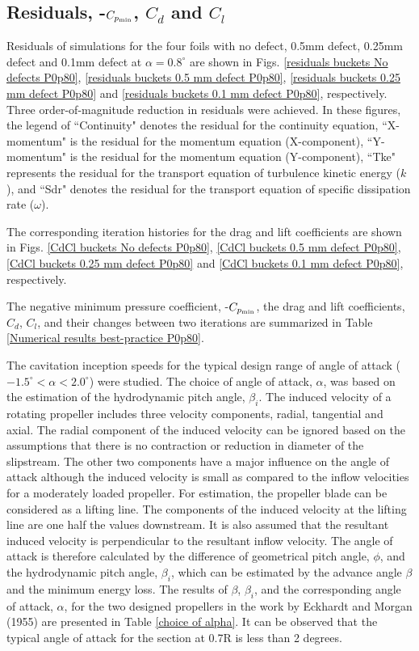 \documentclass[onecolumn,11pt]{report}
\begin{document}
\subsection{Residuals, -$C_{p_{\rm min}}$, $C_d$ and $C_l$}

Residuals of simulations for the four foils with no defect, 0.5mm defect, 0.25mm defect and 0.1mm defect at $\alpha=0.8^\circ$ are shown in Figs.  \ref{residuals buckets No defects P0p80}, \ref{residuals buckets 0.5 mm defect P0p80}, \ref{residuals buckets 0.25 mm defect P0p80} and \ref{residuals buckets 0.1 mm defect P0p80}, respectively. Three order-of-magnitude reduction in residuals were achieved. In these figures, the legend of ``Continuity" denotes the residual for the continuity equation, ``X-momentum" is the residual for the momentum equation (X-component), ``Y-momentum" is the residual for the momentum equation (Y-component), ``Tke" represents the residual for the transport equation of turbulence kinetic energy ($k$), and ``Sdr" denotes the residual for the transport equation of specific dissipation rate ($\omega$).

The corresponding iteration histories for the drag and lift coefficients are shown in Figs.  \ref{CdCl buckets No defects P0p80}, \ref{CdCl buckets 0.5 mm defect P0p80}, \ref{CdCl buckets 0.25 mm defect P0p80} and \ref{CdCl buckets 0.1 mm defect P0p80}, respectively.

The negative minimum pressure coefficient, -$C_{p_{\rm min}}$, the drag and lift coefficients, $C_d$, $C_l$, and their changes between  two iterations are summarized in Table  \ref{Numerical results best-practice P0p80}. 


The cavitation inception speeds for the typical design range of angle of attack ($-1.5^\circ < \alpha < 2.0^\circ$) were studied. The choice of angle of attack, $\alpha$, was based on the estimation of the hydrodynamic pitch angle, $\beta_i$. The induced velocity of a rotating propeller includes three velocity components, radial, tangential and axial. The radial component of the induced velocity can be ignored based on the assumptions that there is no contraction or reduction in diameter of the slipstream. The other two components have a major influence on the angle of attack although the induced velocity is small as compared to the inflow velocities for a moderately loaded propeller. For estimation, the propeller blade can be considered as a lifting line. The components of the induced velocity at the lifting line are one half the values downstream. It is also assumed that the resultant induced velocity is perpendicular to the resultant inflow velocity. The angle of attack is therefore calculated by the difference of geometrical pitch angle, $\phi$, and the hydrodynamic pitch angle, $\beta_i$, which can be estimated by the advance angle $\beta$ and the minimum energy loss. The results of $\beta$, $\beta_i$, and the corresponding angle of attack, $\alpha$, for the two designed propellers in the work by Eckhardt and Morgan (1955) are presented in Table \ref{choice of alpha}. It can be observed that the typical angle of attack for the section at 0.7R is less than 2 degrees.
\end{document}
